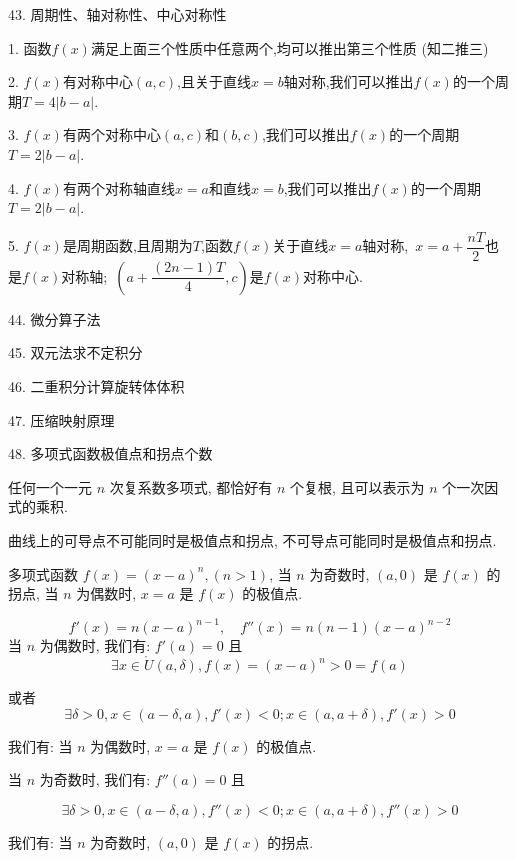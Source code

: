 43. 周期性、轴对称性、中心对称性
\begin{theorem}
	1. 函数$f(x)$满足上面三个性质中任意两个,均可以推出第三个性质 (知二推三)
	
	2. $f(x)$有对称中心$(a,c)$,且关于直线$x=b$轴对称,我们可以推出$f(x)$的一个周期$T=4|b-a|$.
	
	3. $f(x)$有两个对称中心$(a,c)$和$(b,c)$,我们可以推出$f(x)$的一个周期$T=2|b-a|$.
	
	4. $f(x)$有两个对称轴直线$x=a$和直线$x=b$,我们可以推出$f(x)$的一个周期$T=2|b-a|$.
	
	5. $f(x)$是周期函数,且周期为$T$,函数$f(x)$关于直线$x=a$轴对称,\ $x=a+\dfrac{nT}{2}$也是$f(x)$对称轴;\ $(a+\dfrac{(2n-1)T}{4},c)$是$f(x)$对称中心.
\end{theorem}

44. 微分算子法

45. 双元法求不定积分

46. 二重积分计算旋转体体积

47. 压缩映射原理

48. 多项式函数极值点和拐点个数

\begin{theorem}[代数基本定理]\label{the: 代数基本定理}
	任何一个一元 $n$ 次复系数多项式, 都恰好有 $n$ 个复根, 且可以表示为 $n$ 个一次因式的乘积.
\end{theorem}

\begin{corollary}[曲线的极值点和拐点]
	曲线上的可导点不可能同时是极值点和拐点, 不可导点可能同时是极值点和拐点.
\end{corollary}

\begin{proposition}\label{pro: 命题一}
	多项式函数 $f(x) = (x-a)^{n},(n>1)$, 当 $n$ 为奇数时, $(a,0)$ 是 $f(x)$ 的拐点, 当 $n$ 为偶数时, $x=a$ 是 $f(x)$ 的极值点.
\end{proposition}
\begin{anymark}[证明]

	$$f'(x) = n(x-a)^{n-1},\quad f''(x) = n(n-1)(x-a)^{n-2}$$
	当 $n$ 为偶数时, 我们有: $f'(a) = 0$ 且 
	$$\exists x\in \mathring{U}(a,\delta), f(x) = (x-a)^{n} > 0 = f(a)$$

	或者 
	$$\exists \delta > 0, x\in (a-\delta,a),f'(x)<0; x\in (a,a+\delta),f'(x)>0$$
	
	我们有: 当 $n$ 为偶数时, $x=a$ 是 $f(x)$ 的极值点.
	
	当 $n$ 为奇数时, 我们有: $f''(a) = 0$ 且
	
	$$\exists \delta > 0, x\in (a-\delta,a),f''(x)<0; x\in (a,a+\delta),f''(x)>0$$

	我们有: 当 $n$ 为奇数时, $(a,0)$ 是 $f(x)$ 的拐点.
	

\end{anymark}


